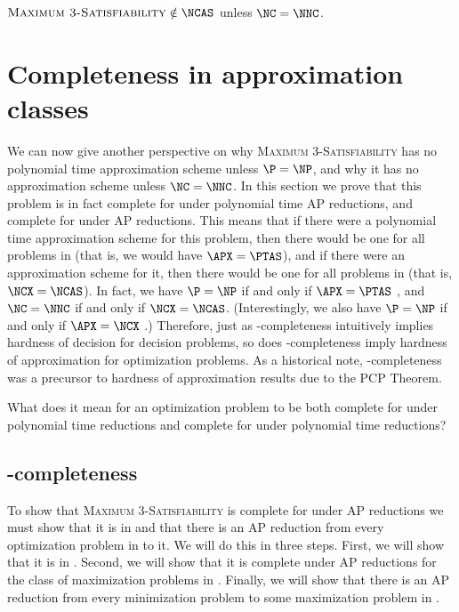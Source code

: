 \documentclass[]{article}
\begin{document}
\begin{corollary}
  $\textsc{Maximum 3-Satisfiability} \notin \NCAS$ unless $\NC = \NNC$.
\end{corollary}

\section{Completeness in approximation classes}\label{sec:complete}

We can now give another perspective on why \textsc{Maximum 3-Satisfiability} has no polynomial time approximation scheme unless $\P = \NP$, and why it has no \NC{} approximation scheme unless $\NC = \NNC$.
In this section we prove that this problem is in fact complete for \APX{} under polynomial time AP reductions, and complete for \NCX{} under \NC{} AP reductions.
This means that if there were a polynomial time approximation scheme for this problem, then there would be one for all problems in \APX{} (that is, we would have $\APX = \PTAS$), and if there were an \NC{} approximation scheme for it, then there would be one for all problems in \NCX{} (that is, $\NCX = \NCAS$).
In fact, we have $\P = \NP$ if and only if $\APX = \PTAS$ \cite[Section~2]{crescenzi97}, and $\NC = \NNC$ if and only if $\NCX = \NCAS$.
(Interestingly, we also have $\P = \NP$ if and only if $\APX = \NCX$ \cite[Theorem~8.2.9]{dsst97}.)
Therefore, just as \NP-completeness intuitively implies hardness of decision for decision problems, so does \APX-completeness imply hardness of approximation for optimization problems.
As a historical note, \APX{}-completeness was a precursor to hardness of approximation results due to the PCP Theorem.

\begin{todo}
  What does it mean for an optimization problem to be both complete for \APX{} under polynomial time reductions and complete for \NCX{} under polynomial time reductions?
\end{todo}

\subsection{\texorpdfstring{\APX}{APX}-completeness}\label{ssc:apxcomplete}

To show that \textsc{Maximum 3-Satisfiability} is complete for \APX{} under AP reductions we must show that it is in \APX{} and that there is an AP reduction from every optimization problem in \APX{} to it.
We will do this in three steps.
First, we will show that it is in \APX.
Second, we will show that it is complete under AP reductions for the class of maximization problems in \APX.
Finally, we will show that there is an AP reduction from every minimization problem to some maximization problem in \APX.
\end{document}
